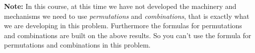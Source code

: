 \documentclass[a4paper]{exam}
\begin{document}
\begin{questions}

    \textbf{Note:} In this course, at this time we have not developed the machinery and mechanisms we need to use \emph{permutations} and \emph{combinations}, that is exactly what we are developing in this problem. Furthermore the formulas for permutations and combinations are built on the above results. So you can't use the formula for permutations and combinations in this problem.
\end{questions}
\end{document}
